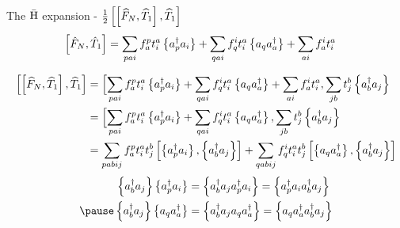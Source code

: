 \begin{frame}{The $\bar{\mathrm{H}}$ expansion - $\frac{1}{2}\left[ \left[ \widehat{F}_N, \widehat{T}_1 \right], \widehat{T}_1 \right]$}
    \small
        \begin{align*}
        \left[ \hat{F}_N, \hat{T}_1 \right] &= \sum_{pai} f_a^p t_i^a \left\{a_p^\dagger a_i\right\} + 
                \sum_{qai} f_q^i t_i^a \left\{a_q a_a^\dagger\right\} + \sum_{ai} f_a^i t_i^a
        \end{align*}

        \pause
    \begin{align*}
        \left[ \left[ \widehat{F}_N, \widehat{T}_1 \right], \widehat{T}_1\right] 
        &= \Bigl[ \sum_{pai} f_a^p t_i^a \left\{a_p^\dagger a_i\right\} +
            \sum_{qai} f_q^i t_i^a \left\{a_q a_a^\dagger\right\} + \sum_{ai} f_a^i t_i^a, \sum_{jb} t_j^b \left\{a_b^\dagger a_j\right\} \\
        &= \Bigl[ \sum_{pai} f_a^p t_i^a \left\{a_p^\dagger a_i\right\} +
            \sum_{qai} f_q^i t_i^a \left\{a_q a_a^\dagger\right\}, \sum_{jb} t_j^b \left\{a_b^\dagger a_j\right\} \\
        &= \sum_{pabij} f_a^p t_i^a t_j^b \left[ \left\{a_p^\dagger a_i\right\}, \left\{a_b^\dagger a_j\right\} \right] +
            \sum_{qabij} f_q^i t_i^a t_j^b \left[ \left\{a_q a_a^\dagger\right\}, \left\{a_b^\dagger a_j\right\} \right]
    \end{align*}
        \pause
    \begin{align*}
        \normord{a_b^\dagger a_j} \normord{a_p^\dagger a_i} &= \normord{a_b^\dagger a_j a_p^\dagger a_i} 
            = \normord{ a_p^\dagger a_i a_b^\dagger a_j} \\
        \pause
        \normord{a_b^\dagger a_j} \normord{a_q a_a^\dagger} &= \normord{ a_b^\dagger a_j a_q a_a^\dagger} 
            =  \normord{ a_q a_a^\dagger a_b^\dagger a_j}
    \end{align*}
\end{frame}

    
